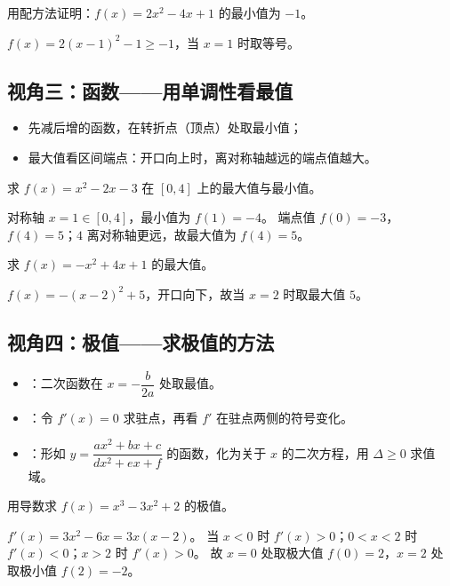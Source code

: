 \begin{explore}
\begin{problem}
用配方法证明：$f(x)=2x^2-4x+1$ 的最小值为 $-1$。
\end{problem}
\begin{solution}
$f(x)=2(x-1)^2-1\geq-1$，当 $x=1$ 时取等号。
\end{solution}

\subsection{视角三：函数——用单调性看最值}

\begin{itemize}
  \item 先减后增的函数，在转折点（顶点）处取最小值；
  \item 最大值看区间端点：开口向上时，离对称轴越远的端点值越大。
\end{itemize}

\begin{example}
求 $f(x)=x^2-2x-3$ 在 $[0,4]$ 上的最大值与最小值。
\end{example}
\begin{solution}
对称轴 $x=1\in[0,4]$，最小值为 $f(1)=-4$。
端点值 $f(0)=-3$，$f(4)=5$；$4$ 离对称轴更远，故最大值为 $f(4)=5$。
\end{solution}

\begin{problem}
求 $f(x)=-x^2+4x+1$ 的最大值。
\end{problem}
\begin{solution}
$f(x)=-(x-2)^2+5$，开口向下，故当 $x=2$ 时取最大值 $5$。
\end{solution}

\subsection{视角四：极值——求极值的方法}

\begin{itemize}
  \item {}：二次函数在 $x=-\dfrac{b}{2a}$ 处取最值。
  \item {}：令 $f'(x)=0$ 求驻点，再看 $f'$ 在驻点两侧的符号变化。
  \item {}：形如 $y=\dfrac{ax^2+bx+c}{dx^2+ex+f}$ 的函数，化为关于 $x$ 的二次方程，用 $\Delta\geq0$ 求值域。
\end{itemize}

\begin{example}
用导数求 $f(x)=x^3-3x^2+2$ 的极值。
\end{example}
\begin{solution}
$f'(x)=3x^2-6x=3x(x-2)$。
当 $x<0$ 时 $f'(x)>0$；$0<x<2$ 时 $f'(x)<0$；$x>2$ 时 $f'(x)>0$。
故 $x=0$ 处取极大值 $f(0)=2$，$x=2$ 处取极小值 $f(2)=-2$。
\end{solution}


\end{explore}
